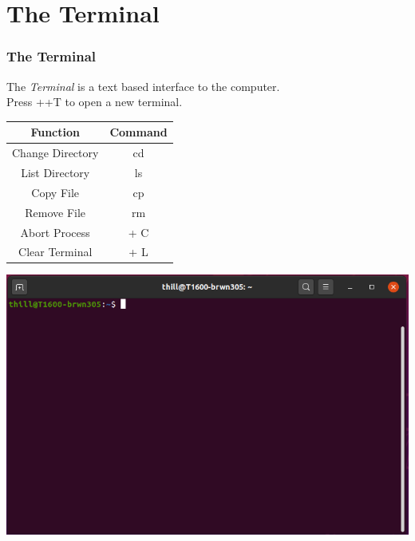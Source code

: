 \documentclass[fleqn]{beamer} %
\newcommand{\sectiontitleIV}{The Terminal}
\begin{document}
\section{\sectiontitleIV}	
	\begin{frame}[label=sectionIV] \small
		\frametitle{\sectiontitleIV}    
          The {\it Terminal} is a text based interface to the computer.\vspace{2mm}\\ Press \CTRLKey+\ALTKey+T to open a new terminal. \vspace{3mm}\\      
                \begin{multicols}{2}
		
		\renewcommand{\arraystretch}{1.4}
		\begin{tabular}{|c|c|}\hline
				Function & Command \\ \hline
			 Change Directory & cd  \\ 
			List Directory & ls \\  
			Copy File& cp \\ 
			Remove File& rm  \\ 
			Abort Process& \CTRLKey + C  \\ 
			Clear Terminal& \CTRLKey + L  \\ \hline
				
		\end{tabular}
			
		\hspace{10mm}\includegraphics[scale=.20]{ubuntu_terminal.png}  
       	       
        \end{multicols}

       	                       
                
		\end{frame}
		
\end{document}
